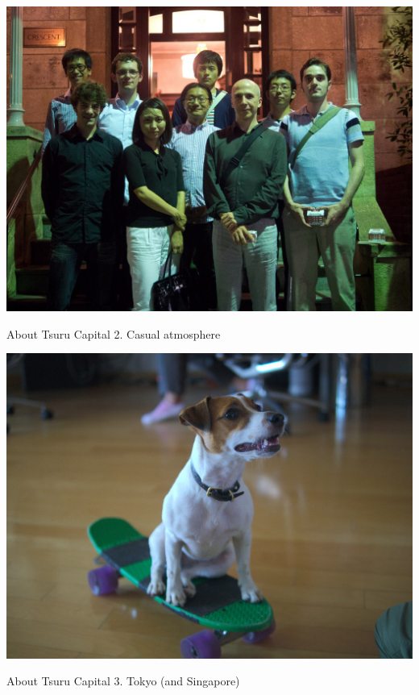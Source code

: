 \documentclass[20pt]{beamer}
\begin{document}
\begin{frame}[plain]
    \includegraphics[width=\textwidth]{images/group-picture.jpg}
\end{frame}

\begin{frame}{About Tsuru Capital}
    2. Casual atmosphere
\end{frame}

\begin{frame}[plain]
    \includegraphics[width=\textwidth]{images/teito-skateboard.jpg}
\end{frame}

\begin{frame}{About Tsuru Capital}
    3. Tokyo \small{(and Singapore)}
\end{frame}
\end{document}
